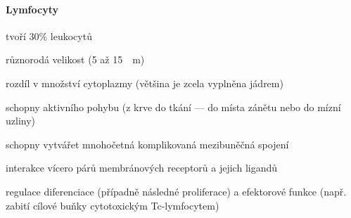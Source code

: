 \documentclass[DIV=8]{scrreprt}
\begin{document}
\paragraph{Lymfocyty}
\begin{myItemize}[nosep]
    \item tvoří 30\% leukocytů
    \item různorodá velikost (\si{5} až \si{15 \mu m})
\begin{myItemize}[nosep]
    \item rozdíl v množství cytoplazmy (většina je zcela vyplněna jádrem)
\end{myItemize}

    \item schopny aktivního pohybu (z krve do tkání --- do místa zánětu nebo do mízní uzliny)
    \item schopny vytvářet mnohočetná komplikovaná mezibuněčná spojení
\begin{myItemize}[nosep]
    \item interakce vícero párů membránových receptorů a jejich ligandů
    \item regulace diferenciace (případně následné proliferace) a efektorové funkce (např. zabití cílové buňky cytotoxickým Tc-lymfocytem)
\end{myItemize}

\end{myItemize}
\end{document}
